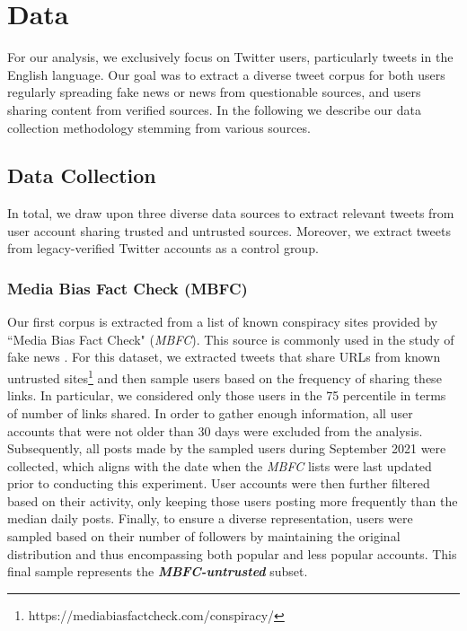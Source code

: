 \section{Data}
\label{sec:data}
For our analysis, we exclusively focus on Twitter users, particularly tweets in the English language. Our goal was to extract a diverse tweet corpus for both users regularly spreading fake news or news from questionable sources, and users sharing content from verified sources. In the following we describe our data collection methodology stemming from various sources.


\subsection{Data Collection}

In total, we draw upon three diverse data sources to extract relevant tweets from user account sharing trusted and untrusted sources. %
Moreover, we extract tweets from legacy-verified Twitter accounts as a control group. %


\subsubsection{Media Bias Fact Check (MBFC)} 
\label{sec:mbfc}
Our first corpus is extracted from a list of known conspiracy sites provided by ``Media Bias Fact Check" (\textit{MBFC}). This source is commonly used in the study of fake news \cite{nakov2020fact, cinelli2020covid}. For this dataset, we extracted tweets that share URLs from known untrusted sites\footnote{https://mediabiasfactcheck.com/conspiracy/} and then sample users based on the frequency of sharing these links. In particular, we considered only those users in the 75 percentile in terms of number of links shared. In order to gather enough information, all user accounts that were not older than 30 days were excluded from the analysis.  Subsequently, all posts made by the sampled users during September 2021 were collected, which aligns with the date when the \textit{MBFC} lists were last updated prior to conducting this experiment. User accounts were then further filtered based on their activity, only keeping those users posting more frequently than the median daily posts. %
Finally, to ensure a diverse representation, users were sampled based on their number of followers by maintaining the original distribution and thus encompassing both popular and less popular accounts. This final sample represents the \textbf{\textit{MBFC-untrusted}} subset.

